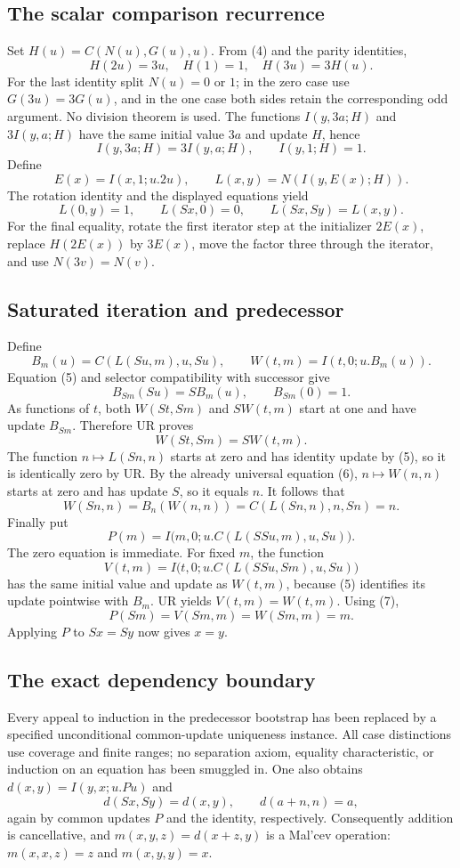 \documentclass[11pt]{article}
\theoremstyle{definition}\newtheorem{definition}[theorem]{Definition}
\begin{document}
\subsection{The scalar comparison recurrence}
Set $H(u)=C(N(u),G(u),u)$.  From (4) and the parity identities,
\[
                 H(2u)=3u,\quad H(1)=1,\quad H(3u)=3H(u).
\]
For the last identity split $N(u)=0$ or $1$; in the zero case use
$G(3u)=3G(u)$, and in the one case both sides retain the corresponding
odd argument.  No division theorem is used.
The functions $I(y,3a;H)$ and $3I(y,a;H)$ have the same initial
value $3a$ and update $H$, hence
\[
 I(y,3a;H)=3I(y,a;H),\qquad I(y,1;H)=1.
\]
Define
\[
 E(x)=I(x,1;u.2u),\qquad L(x,y)=N(I(y,E(x);H)).
\]
The rotation identity and the displayed equations yield
\[
 L(0,y)=1,\qquad L(Sx,0)=0,\qquad L(Sx,Sy)=L(x,y).        \tag{5}
\]
For the final equality, rotate the first iterator step at the initializer
$2E(x)$, replace $H(2E(x))$ by $3E(x)$, move the factor three through
the iterator, and use $N(3v)=N(v)$.

\subsection{Saturated iteration and predecessor}
Define
\[
 B_m(u)=C(L(Su,m),u,Su),\qquad W(t,m)=I(t,0;u.B_m(u)).
\]
Equation (5) and selector compatibility with successor give
\[
 B_{Sm}(Su)=S B_m(u),\qquad B_{Sm}(0)=1.
\]
As functions of $t$, both $W(St,Sm)$ and $S W(t,m)$ start at one
and have update $B_{Sm}$.  Therefore UR proves
\[
                             W(St,Sm)=S W(t,m).           \tag{6}
\]
The function $n\mapsto L(Sn,n)$ starts at zero and has identity update
by (5), so it is identically zero by UR.  By the already universal
equation (6), $n\mapsto W(n,n)$ starts at zero and has update $S$,
so it equals $n$.  It follows that
\[
 W(Sn,n)=B_n(W(n,n))=C(L(Sn,n),n,Sn)=n.                   \tag{7}
\]
Finally put
\[
 P(m)=I\bigl(m,0;u.C(L(SSu,m),u,Su)\bigr).
\]
The zero equation is immediate.  For fixed $m$, the function
\[
 V(t,m)=I\bigl(t,0;u.C(L(SSu,Sm),u,Su)\bigr)
\]
has the same initial value and update as $W(t,m)$, because (5)
identifies its update pointwise with $B_m$.  UR yields $V(t,m)=W(t,m)$.
Using (7),
\[
 P(Sm)=V(Sm,m)=W(Sm,m)=m.
\]
Applying $P$ to $Sx=Sy$ now gives $x=y$.

\subsection{The exact dependency boundary}
Every appeal to induction in the predecessor bootstrap has been replaced
by a specified unconditional common-update uniqueness instance.  All case
distinctions use coverage and finite ranges; no separation axiom, equality
characteristic, or induction on an equation has been smuggled in.
One also obtains $d(x,y)=I(y,x;u.Pu)$ and
\[
 d(Sx,Sy)=d(x,y),\qquad d(a+n,n)=a,
\]
again by common updates $P$ and the identity, respectively.
Consequently addition is cancellative, and
$m(x,y,z)=d(x+z,y)$ is a Mal'cev operation:
$m(x,x,z)=z$ and $m(x,y,y)=x$.
\end{document}
